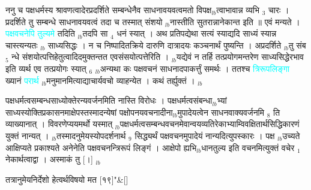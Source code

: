 \documentclass[article,12pt,a4paper]{memoir}%
\newcommand{\quotelemma}[1]{\textcolor{cyan}{#1}}
\newcounter{parCount}
\begin{document}
	  
	  \pstart \leavevmode%
	ननु च पक्षधर्मस्य श्रावणत्वादेरप्रदर्शिते सम्बन्धेनैव साधनावयवत्वमतो विपक्ष{\tiny $_{lb}$}त्वाभावान्न व्यभि {\tiny $_{3}$} चारः । प्रदर्शिते तु सम्बन्धे साधनावयवत्वं तदा च तस्मात् संशयो {\tiny $_{lb}$}नास्तीति सुतरान्नानेकान्त इति ॥ एवं मन्यते । \quotelemma{पक्षवचनेपि तुल्यमे} \cite[6b6]{vn-msN} तदिति {\tiny $_{lb}$}तदपि सा {\tiny $_{4}$} धनं स्यात् । अथ प्रतिपद्येथा सत्यं स्याद्यदि साध्यं स्यान्न चास्त्यन्यतः {\tiny $_{lb}$} \leavevmode{} साध्यसिद्धः । न च निष्पादितक्रिये दारुणि दात्रादयः कञ्चनार्थं पुष्यन्ति । अप्रदर्शिते {\tiny $_{lb}$}तु संब {\tiny $_{5}$} न्धे संशयोत्पत्तिहेतुत्वादिदमुक्तन्तत एवसंसयोत्पत्तेरिति । {\tiny $_{lb}$}यद्येवं न तर्हि तत्प्रयोगमन्तरेण साध्यसिद्धेरभाव इति व्यर्थ एव तत्प्रयोगः स्यात् {\tiny $_{6}$} {\tiny $_{lb}$}अन्यथा कः पक्षवचनं साधनादपाकर्त्तुं समर्थः । ततश्च \quotelemma{त्रिरूपलिङ्गा} ख्यानं \quotelemma{परार्थ} {\tiny $_{lb}$}मनुमानमित्याद्याचार्यवचो व्याहन्येत । कथं तर्ह्युक्तं ।
	{}
	\pend%
      {\tiny $_{lb}$}

	  
	  \pstart \leavevmode%
	पक्षधर्मत्वसम्बन्धसाध्योक्तेरन्यवर्जनमिति नास्ति विरोधः । पक्षधर्मत्वसंबन्धा{\tiny $_{lb}$}भ्यां साध्यस्योक्तिप्रकासनमाक्षेपस्तस्मादन्येषां पक्षोपनयवचनादीना{\tiny $_{lb}$}मुपादेयत्वेन साधनवाक्यवर्जनमि {\tiny $_{8}$} \leavevmode{} ति व्याख्यानात् । विवरणेप्ययमर्थो यस्मात् {\tiny $_{lb}$}पक्षधर्मत्वसम्बन्धवचनमेवान्वयव्यतिरेकाभ्याम्विवक्षितार्थसिद्धिकारणं युक्तं नान्यत् । {\tiny $_{lb}$}तस्मादनुमेयस्योपदर्शनार्थ {\tiny $_{9}$} सिद्ध्यर्थं पक्षवचनमुपादेयं नान्यदित्युपस्कारः । पक्ष {\tiny $_{lb}$}उच्यते आक्षिप्यते प्रकाश्यते अनेनेति पक्षवचनन्त्रिरूपं लिङ्गं । आक्षेपो ह्यभि{\tiny $_{lb}$}धानतुल्य इति वचनमित्युक्तं वचेर {\tiny $_{1}$} नेकार्थत्वाद्वा । अस्माकं तु [।]
	{}
	\pend%
      {\tiny $_{lb}$}
	  \bigskip
	  \begingroup
	
	    
	    \stanza[\smallbreak]
	  तत्रानुमेयनिर्देशो हेत्वर्थविषयो मत [१९]{\normalfontlatin\large\qquad{}"}\&[\smallbreak]
	  
\end{document}
